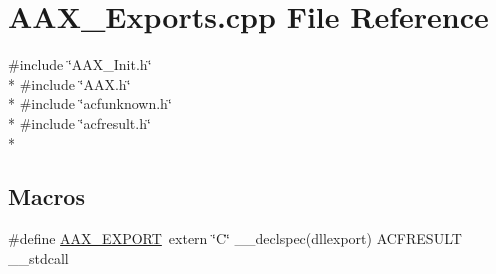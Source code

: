 \hypertarget{a00209}{}\section{A\+A\+X\+\_\+\+Exports.\+cpp File Reference}
\label{a00209}
{\ttfamily \#include \char`\"{}A\+A\+X\+\_\+\+Init.\+h\char`\"{}}\\*
{\ttfamily \#include \char`\"{}A\+A\+X.\+h\char`\"{}}\\*
{\ttfamily \#include \char`\"{}acfunknown.\+h\char`\"{}}\\*
{\ttfamily \#include \char`\"{}acfresult.\+h\char`\"{}}\\*
\subsection*{Macros}
\begin{DoxyCompactItemize}
\item 
\#define \hyperlink{a00209_ac70085d71c555deff0dfb54c2b503f4c}{A\+A\+X\+\_\+\+E\+X\+P\+O\+R\+T}~extern \char`\"{}C\char`\"{} \+\_\+\+\_\+declspec(dllexport) A\+C\+F\+R\+E\+S\+U\+L\+T \+\_\+\+\_\+stdcall
\end{DoxyCompactItemize}
